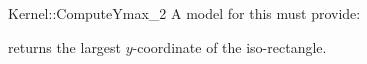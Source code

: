 \begin{ccRefFunctionObjectConcept}{Kernel::ComputeYmax_2}
A model for this must provide:


       {returns the largest $y$-coordinate of the iso-rectangle.}


\ccRefines
{}



\end{ccRefFunctionObjectConcept}
